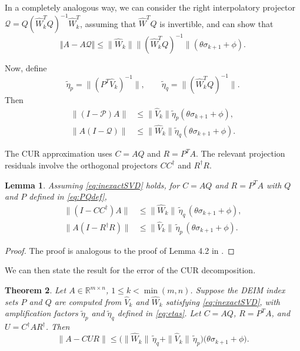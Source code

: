 \documentclass[10pt,a4paper]{amsart}
\newcommand{\What}{\widehat{W}}
\newcommand{\Vhat}{\widehat{V}}
\newcommand{\E}{\theta}
\newcommand{\F}{\phi}
\def\norm#1{\|#1\|}
\newtheorem{theorem}{Theorem}[section]
\newtheorem{lemma}[theorem]{Lemma}
\begin{document}
In a completely analogous way, we can consider the right interpolatory projector $\mathcal{Q} = Q(\What_k^TQ)^{-1}\What_k^T$, assuming that $\What^TQ$ is invertible, and can show that 
\begin{equation}
    \Vert A - A\mathcal{Q}\Vert \leq \norm{\What_k}\norm{(\What_k^T Q)^{-1}}(\E\sigma_{k+1}+\F).
\end{equation}


Now, define
\begin{equation}
    \tilde{\eta}_p = \norm{(P^T\Vhat_k)^{-1}}, \qquad 
    \tilde{\eta}_q = \norm{(\What_k^T Q)^{-1}}.
    \label{eq:etas}
\end{equation}
Then 
\begin{align}
    \norm{(I-\mathcal{P})A} & \leq \norm{\Vhat_k}\tilde{\eta}_p(\E\sigma_{k+1}+\F),\\
    \norm{A(I-\mathcal{Q})} &\leq \norm{\What_k}\tilde{\eta}_q (\E\sigma_{k+1}+\F).
\end{align}

The CUR approximation uses $C = AQ$ and $R = P^T A$.
The relevant projection residuals involve the orthogonal projectors
$CC^\dagger$ and $R^\dagger R$.
\begin{lemma}
\label{lem:CR}
Assuming \eqref{eq:inexactSVD} holds, for $C = AQ$ and $R = P^T A$ with $Q$ and $P$ defined in \eqref{eq:PQdef},
\begin{align}
  \norm{(I - CC^\dagger)A} &\leq \norm{\What_k}\,\tilde\eta_q\,(\E\sigma_{k+1}+\F),
  \label{eq:C_res} \\
  \norm{A(I - R^\dagger R)} &\leq \norm{\Vhat_k}\,\tilde\eta_p\,(\E\sigma_{k+1}+\F).
  \label{eq:R_res}
\end{align}
\end{lemma}

\begin{proof}
The proof is analogous to the proof of Lemma 4.2 in \cite{sorensen2016deim}.
\end{proof}

We can then state the result for the error of the CUR decomposition. 

\begin{theorem}
\label{thm:main}
Let $A \in \mathbb{R}^{m\times n}$, $1 \le k < \min(m,n)$.  Suppose the DEIM index
sets $P$ and $Q$ are computed from $\Vhat_k$ and $\What_k$
satisfying \eqref{eq:inexactSVD}, with amplification factors
$\tilde\eta_p$ and $\tilde\eta_q$ defined in \eqref{eq:etas}.  Let $C = AQ$, $R = P^T A$, and
$U = C^\dagger A R^\dagger$.  Then
\begin{equation}
  \norm{A - CUR}
  \leq
  \bigl(\norm{\What_k}\,\tilde\eta_q + \norm{\Vhat_k}\,\tilde\eta_p\bigr)
  \bigl(\E\sigma_{k+1} + \F\bigr).
  \label{eq:main}
\end{equation} 
\end{theorem}
\end{document}
